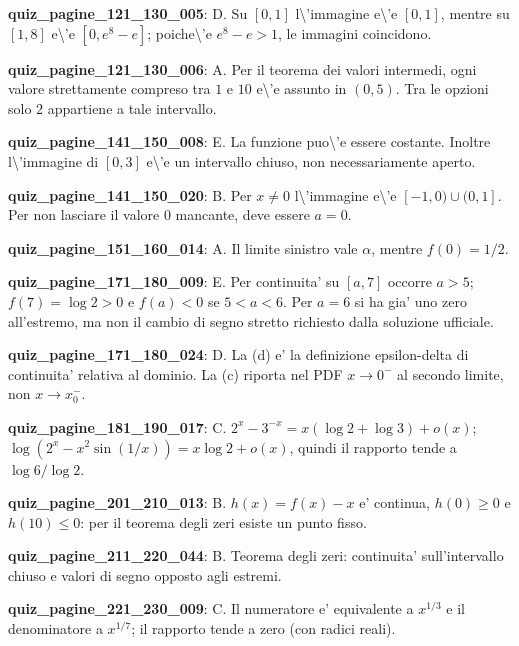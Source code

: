 \documentclass[11pt,a4paper]{article}
\newcounter{quiz}
\begin{document}
\noindent\textbf{quiz\_pagine\_121\_130\_005}: D. Su $[0,1]$ l\textbackslash{}'immagine e\textbackslash{}'e $[0,1]$, mentre su $[1,8]$ e\textbackslash{}'e $[0,e^8-e]$; poiche\textbackslash{}'e $e^8-e>1$, le immagini coincidono.\par\medskip
\noindent\textbf{quiz\_pagine\_121\_130\_006}: A. Per il teorema dei valori intermedi, ogni valore strettamente compreso tra $1$ e $10$ e\textbackslash{}'e assunto in $(0,5)$. Tra le opzioni solo $2$ appartiene a tale intervallo.\par\medskip
\noindent\textbf{quiz\_pagine\_141\_150\_008}: E. La funzione puo\textbackslash{}'e essere costante. Inoltre l\textbackslash{}'immagine di $[0,3]$ e\textbackslash{}'e un intervallo chiuso, non necessariamente aperto.\par\medskip
\noindent\textbf{quiz\_pagine\_141\_150\_020}: B. Per $x\neq0$ l\textbackslash{}'immagine e\textbackslash{}'e $[-1,0)\cup(0,1]$. Per non lasciare il valore $0$ mancante, deve essere $a=0$.\par\medskip
\noindent\textbf{quiz\_pagine\_151\_160\_014}: A. Il limite sinistro vale $\alpha$, mentre $f(0)=1/2$.\par\medskip
\noindent\textbf{quiz\_pagine\_171\_180\_009}: E. Per continuita' su $[a,7]$ occorre $a>5$; $f(7)=\log2>0$ e $f(a)<0$ se $5<a<6$. Per $a=6$ si ha gia' uno zero all'estremo, ma non il cambio di segno stretto richiesto dalla soluzione ufficiale.\par\medskip
\noindent\textbf{quiz\_pagine\_171\_180\_024}: D. La (d) e' la definizione epsilon-delta di continuita' relativa al dominio. La (c) riporta nel PDF $x\to0^-$ al secondo limite, non $x\to x_0^-$.\par\medskip
\noindent\textbf{quiz\_pagine\_181\_190\_017}: C. $2^x-3^{-x}=x(\log2+\log3)+o(x)$; $\log(2^x-x^2\sin(1/x))=x\log2+o(x)$, quindi il rapporto tende a $\log6/\log2$.\par\medskip
\noindent\textbf{quiz\_pagine\_201\_210\_013}: B. $h(x)=f(x)-x$ e' continua, $h(0)\ge0$ e $h(10)\le0$: per il teorema degli zeri esiste un punto fisso.\par\medskip
\noindent\textbf{quiz\_pagine\_211\_220\_044}: B. Teorema degli zeri: continuita' sull'intervallo chiuso e valori di segno opposto agli estremi.\par\medskip
\noindent\textbf{quiz\_pagine\_221\_230\_009}: C. Il numeratore e' equivalente a $x^{1/3}$ e il denominatore a $x^{1/7}$; il rapporto tende a zero (con radici reali).\par\medskip
\end{document}
